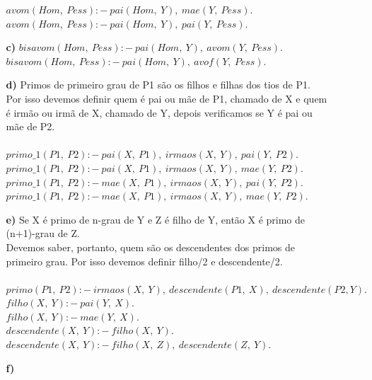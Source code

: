 \documentclass[12pt]{article}
\begin{document}
\begin{itemize}
\begin{itemize}
					\hfill\newline
					$avom(Hom, \ Pess) :- \ pai(Hom,\  Y), \ mae(Y, \ Pess).$\\
					$avom(Hom, \ Pess) :- \ pai(Hom, \ Y), \ pai(Y, \ Pess).$\\
				\item[\textbf{c) }]
					\hfill\newline
					$bisavom(Hom, \ Pess) :- \ pai(Hom, \ Y), \ avom(Y, \ Pess).$\\
					$bisavom(Hom, \ Pess) :- \ pai(Hom, \ Y), \ avof(Y, \ Pess).$\\
				\newpage
				\item[\textbf{d) }]
					\hfill\newline
					Primos de primeiro grau de P1 são os filhos e filhas dos tios de P1.\\
					Por isso devemos definir quem é pai ou mãe de P1, chamado de X
					e quem é irmão ou irmã de X, chamado de Y, depois verificamos se Y é
					pai ou mãe de P2.\\ \\
					$primo\_1(P1, \ P2) :- \ pai(X, \ P1), \ irmaos(X, \ Y), \ pai(Y, \ P2).$\\
					$primo\_1(P1, \ P2) :- \ pai(X, \ P1), \ irmaos(X, \ Y), \ mae(Y, \ P2).$\\
					$primo\_1(P1, \ P2) :- \ mae(X, \ P1), \ irmaos(X, \ Y), \ pai(Y, \ P2).$\\
					$primo\_1(P1, \ P2) :- \ mae(X, \ P1), \ irmaos(X, \ Y), \ mae(Y, \ P2).$\\
				\item[\textbf{e) }]
					\hfill\newline
					Se X é primo de n-grau de Y e Z é filho de Y, então X é
					primo de (n+1)-grau de Z.\\
					Devemos saber, portanto, quem são os descendentes dos primos de primeiro grau.
					Por isso devemos definir filho/2 e descendente/2.\\ \\
					$primo(P1, \ P2) :- \ irmaos(X, \ Y), \ descendente(P1, \ X), \ descendente(P2, Y).$\\
					$filho(X, \ Y) :- \ pai(Y, \ X).$\\
					$filho(X, \ Y) :- \ mae(Y, \ X).$\\
					$descendente(X, \ Y) :- \ filho(X, \ Y).$\\
					$descendente(X, \ Y) :- \ filho(X, \ Z), \ descendente(Z, \ Y).$
				\item[\textbf{f) }]
					\hfill\newline

\end{itemize}
\end{itemize}
\end{document}
